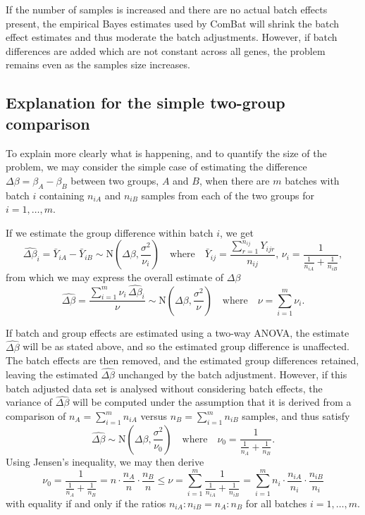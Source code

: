 \documentclass{bio}
\begin{document}
If the number of samples is increased and there are no actual batch effects present, the empirical Bayes estimates used by ComBat will shrink the batch effect estimates and thus moderate the batch adjustments. However, if batch differences are added which are not constant across all genes, the problem remains even as the samples size increases.

\subsection{Explanation for the simple two-group comparison}
\label{sec:twogroups}

To explain more clearly what is happening, and to quantify the size of the problem, we may consider the simple case of estimating the difference $\Delta\beta=\beta_A-\beta_B$ between two groups, $A$ and $B$, when there are $m$ batches with batch $i$ containing $n_{iA}$ and $n_{iB}$ samples from each of the two groups for $i=1,\ldots,m$.

If we estimate the group difference within batch $i$, we get
\begin{equation}
\widehat{\Delta\beta}_i=\bar{Y}_{iA}-\bar{Y}_{iB}\sim\text{N}\left(\Delta\beta,\frac{\sigma^2}{\nu_i}\right)
\quad\text{where}\quad
\bar{Y}_{ij}=\frac{\sum_{r=1}^{n_{ij}}Y_{ijr}}{n_{ij}},\,
\nu_i=\frac{1}{\frac{1}{n_{iA}}+\frac{1}{n_{iB}}},
\end{equation}
from which we may express the overall estimate of $\Delta\beta$
\begin{equation}
\widehat{\Delta\beta}=\frac{\sum_{i=1}^m \nu_i\,\widehat{\Delta\beta}_i}{\nu}
\sim\text{N}\left(\Delta\beta,\frac{\sigma^2}{\nu}\right)
\quad\text{where}\quad
\nu=\sum_{i=1}^m\nu_i.
\end{equation}

If batch and group effects are estimated using a two-way ANOVA, the estimate $\widehat{\Delta\beta}$ will be as stated above, and so the estimated group difference is unaffected. The batch effects are then removed, and the estimated group differences retained, leaving the estimated $\widehat{\Delta\beta}$ unchanged by the batch adjustment. However, if this batch adjusted data set is analysed without considering batch effects, the variance of $\widehat{\Delta\beta}$ will be computed under the assumption that it is derived from a comparison of $n_A=\sum_{i=1}^m n_{iA}$ versus $n_B=\sum_{i=1}^m n_{iB}$ samples, and thus satisfy
\begin{equation}
\widehat{\Delta\beta}
\sim\text{N}\left(\Delta\beta,\frac{\sigma^2}{\nu_0}\right)
\quad\text{where}\quad
\nu_0=\frac{1}{\frac{1}{n_A}+\frac{1}{n_B}}.
\end{equation}
Using Jensen's inequality, we may then derive
\begin{equation}
\nu_0
=\frac{1}{\frac{1}{n_A}+\frac{1}{n_B}}=n\cdot\frac{n_A}{n}\cdot\frac{n_B}{n}
\le
\nu
=\sum_{i=1}^m \frac{1}{\frac{1}{n_{iA}}+\frac{1}{n_{iB}}}
=\sum_{i=1}^m n_i\cdot\frac{n_{iA}}{n_i}\cdot\frac{n_{iB}}{n_i}
\end{equation}
with equality if and only if the ratios $n_{iA}:n_{iB}=n_A:n_B$ for all batches $i=1,\ldots,m$.
\end{document}

